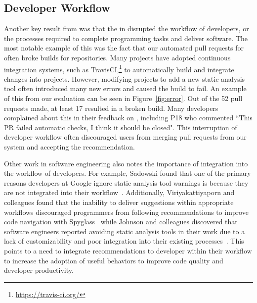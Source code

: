 \subsection{Developer Workflow}

Another key result from \sorry was that the \tele in \tool disrupted the workflow of developers, or the processes required to complete programming tasks and deliver software. The most notable example of this was the fact that our automated pull requests for \EP often broke builds for repositories. Many projects have adopted continuous integration systems, such as TravisCI,\footnote{\url{https://travis-ci.org/}} to automatically build and integrate changes into projects. However, modifying projects to add a new static analysis tool often introduced many new errors and caused the build to fail. An example of this from our evaluation can be seen in Figure~\ref{fig:error}. Out of the 52 pull requests made, at least 17 resulted in a broken build. Many developers complained about this in their feedback on \tool, including P18 who commented ``This PR failed automatic checks, I think it should be closed". This interruption of developer workflow often discouraged users from merging pull requests from our system and accepting the recommendation.

Other work in software engineering also notes the importance of integration into the workflow of developers. For example, Sadowski found that one of the primary reasons developers at Google ignore static analysis tool warnings is because they are not integrated into their workflow~\cite{sadowski2018lessons}. Additionally, Viriyakattiyaporn and colleagues found that the inability to deliver suggestions within appropriate workflows discouraged programmers from following recommendations to improve code navigation with Spyglass~\cite{viriyakattiyaporn2009challenges} while Johnson and colleagues discovered that software engineers reported avoiding static analysis tools in their work due to a lack of customizability and poor integration into their existing processes~\cite{Johnson2013Why}. This points to a need to integrate recommendations to developer within their workflow to increase the adoption of useful behaviors to improve code quality and developer productivity. 

